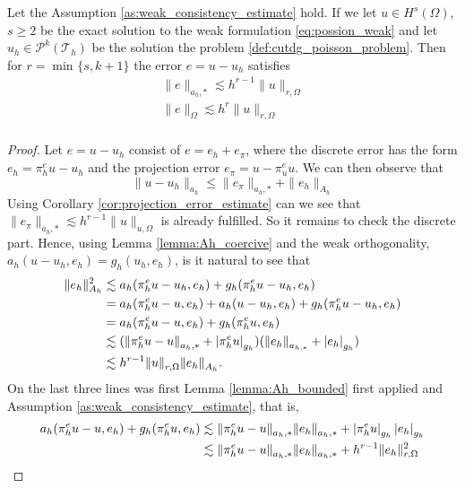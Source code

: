 \begin{theorem}
    Let the Assumption \ref{as:weak_consistency_estimate} hold. If we let $u \in H^{s}( \Omega ) $, $s\ge 2$ be the exact solution to the weak formulation \eqref{eq:possion_weak} and let $u_{h} \in \mathcal{P}^{k}( \mathcal{T} _{h})  $ be the solution the problem \ref{def:cutdg_poisson_problem}. Then for $r =
    \min_{}\{s, k+1\} $ the error $e = u - u_{h}$ satisfies \[
        \begin{split}
    \| e \|_{ a_{h},* }^{  } \lesssim   h^{r-1} \| u \|_{ r,\Omega  }^{  }\\
    \| e \|_{ \Omega  }^{  } \lesssim   h^{r} \| u \|_{ r,\Omega  }^{  }\\
        \end{split}
    \]
\end{theorem}
\begin{proof}
    Let $e = u - u_{h}$ consist of $e = e_{h} + e_{\pi }$, where the discrete error has the form $e_{h} = \pi _{h}^{e} u - u_{h}$ and the projection error $e_{\pi } = u - \pi _{u} ^{e}u$. We can then observe that \[
    \| u - u_{h} \|_{ a_{h} }^{  }  \le \| e_{\pi } \|_{a_{h},*}^{  } + \| e_{h} \|_{A_{h}  }^{  }
    \]
Using Corollary \ref{cor:projection_error_estimate} can we see that $\| e_{\pi } \|_{a_{h},*}^{  } \lesssim h^{r-1} \| u \|_{ u,\Omega  }^{  }  $ is already fulfilled. So it remains to check the discrete part. Hence, using Lemma
\ref{lemma:Ah_coercive} and
the weak orthogonality, $ a_{h}( u - u_{h}, e_{h}) = g_{h}( u_{h}, e_{h})$, is it natural to see that \[
    \begin{split}
\| e_{h} \|_{ A_{h} }^{ 2 } & \lesssim a_{h}( \pi _{h}^{e} u - u_{h}, e_{h}) + g_{h}( \pi _{h}^{e}u - u_{h}, e_{h}) \\
 & = a_{h}( \pi _{h}^{e} u - u, e_{h}) + a_{h}( u - u_{h}, e_{h}) + g_{h}( \pi _{h}^{e}u - u_{h}, e_{h}) \\
 & = a_{h}( \pi _{h}^{e} u - u, e_{h}) + g_{h}( \pi _{h}^{e}u, e_{h}) \\
 & \lesssim  ( \| \pi _{h}^{e} u - u \|_{a_{h},*  }^{  } + \left\lvert  \pi ^{e}_{h} u  \right\rvert_{g_{h}}  ) (\| e_{h} \|_{a_{h,*}  }^{  } + \left\lvert  e_{h}  \right\rvert_{g_{h}} ) \\
 & \lesssim h^{r-1} \| u \|_{ r, \Omega  }^{  } \| e_{h} \|_{ A_{h} }^{  }.
    \end{split}
\]
On the last three lines was first Lemma \ref{lemma:Ah_bounded} first applied and Assumption \ref{as:weak_consistency_estimate}, that is, \[
    \begin{split}
        a_{h}( \pi _{h}^{e} u - u, e_{h}) + g_{h}( \pi _{h}^{e}u, e_{h}) &\lesssim \| \pi _{h}^{e} u - u \|_{a_{h},*  }^{  } \| e_{h} \|_{a_{h},*  }^{  } + \left\lvert  \pi _{h}^{e}u  \right\rvert_{g_{h}} \left\lvert e_{h}   \right\rvert_{g_{h}} \\
         &\lesssim \| \pi _{h}^{e} u - u \|_{a_{h},*  }^{  } \| e_{h} \|_{a_{h},*  }^{  } + h^{r-1} \| e_{h} \|_{r, \Omega   }^{2  }   \\
    \end{split}
\]




\end{proof}


